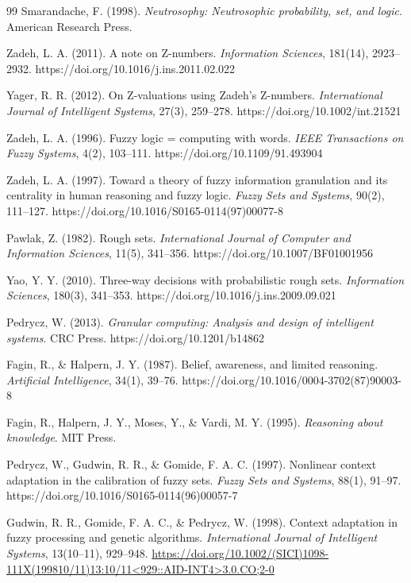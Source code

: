 \documentclass[reqno,final]{amsart}
\theoremstyle{definition}
\theoremstyle{plain}
\theoremstyle{remark}
\begin{document}
\begin{thebibliography}{99}
Smarandache, F. (1998). \textit{Neutrosophy: Neutrosophic probability, set, and logic}. American Research Press.

Zadeh, L. A. (2011). A note on Z-numbers. \textit{Information Sciences}, 181(14), 2923--2932. https://doi.org/10.1016/j.ins.2011.02.022

Yager, R. R. (2012). On Z-valuations using Zadeh's Z-numbers. \textit{International Journal of Intelligent Systems}, 27(3), 259--278. https://doi.org/10.1002/int.21521

Zadeh, L. A. (1996). Fuzzy logic = computing with words. \textit{IEEE Transactions on Fuzzy Systems}, 4(2), 103--111. https://doi.org/10.1109/91.493904

Zadeh, L. A. (1997). Toward a theory of fuzzy information granulation and its centrality in human reasoning and fuzzy logic. \textit{Fuzzy Sets and Systems}, 90(2), 111--127. https://doi.org/10.1016/S0165-0114(97)00077-8

Pawlak, Z. (1982). Rough sets. \textit{International Journal of Computer and Information Sciences}, 11(5), 341--356. https://doi.org/10.1007/BF01001956


Yao, Y. Y. (2010). Three-way decisions with probabilistic rough sets. \textit{Information Sciences}, 180(3), 341--353. https://doi.org/10.1016/j.ins.2009.09.021

Pedrycz, W. (2013). \textit{Granular computing: Analysis and design of intelligent systems}. CRC Press. https://doi.org/10.1201/b14862

Fagin, R., \& Halpern, J. Y. (1987). Belief, awareness, and limited reasoning. \textit{Artificial Intelligence}, 34(1), 39--76. https://doi.org/10.1016/0004-3702(87)90003-8

Fagin, R., Halpern, J. Y., Moses, Y., \& Vardi, M. Y. (1995). \textit{Reasoning about knowledge}. MIT Press.

Pedrycz, W., Gudwin, R. R., \& Gomide, F. A. C. (1997). Nonlinear context adaptation in the calibration of fuzzy sets. \textit{Fuzzy Sets and Systems}, 88(1), 91--97. https://doi.org/10.1016/S0165-0114(96)00057-7

Gudwin, R. R., Gomide, F. A. C., \& Pedrycz, W. (1998). Context adaptation in fuzzy processing and genetic algorithms. \textit{International Journal of Intelligent Systems}, 13(10--11), 929--948. \url{https://doi.org/10.1002/(SICI)1098-111X(199810/11)13:10/11<929::AID-INT4>3.0.CO;2-0}


\end{thebibliography}
\end{document}
